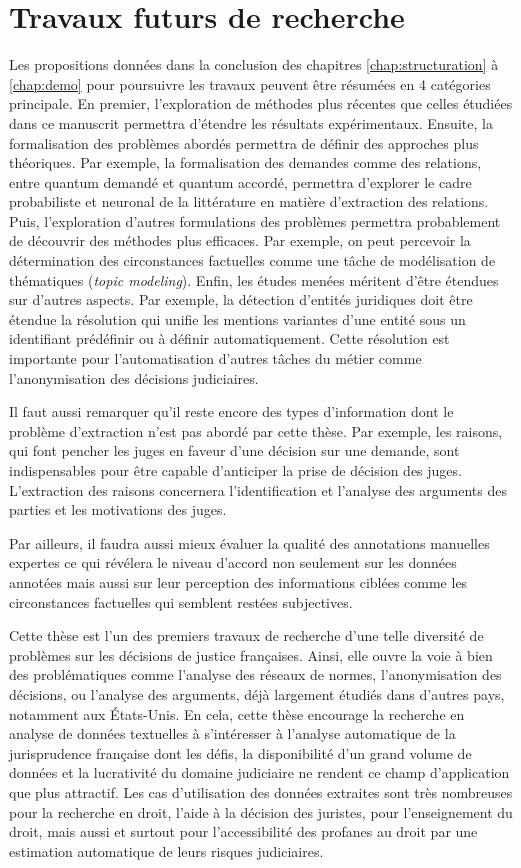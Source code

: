 \section{Travaux futurs de recherche}
\label{sec:conclusion:extensions}
Les propositions données dans la conclusion des chapitres \ref{chap:structuration} à \ref{chap:demo} pour poursuivre les travaux peuvent être résumées en 4 catégories principale. En premier, l'exploration de méthodes plus récentes que celles étudiées dans ce manuscrit permettra d'étendre les résultats expérimentaux. Ensuite, la formalisation des problèmes abordés permettra de définir des approches plus théoriques. Par exemple, la formalisation des demandes comme des relations, entre quantum demandé et quantum accordé, permettra d'explorer le cadre probabiliste et neuronal de la littérature en matière d'extraction des relations. Puis, l'exploration d'autres formulations des problèmes permettra probablement de découvrir des méthodes plus efficaces. Par exemple, on peut percevoir la détermination des circonstances factuelles comme une tâche de modélisation de thématiques (\textit{topic modeling}). Enfin, les études menées méritent d'être étendues sur d'autres aspects. Par exemple, la détection d'entités juridiques doit être étendue la résolution qui unifie les mentions variantes d'une entité sous un identifiant prédéfinir ou à définir automatiquement. Cette résolution est importante pour l'automatisation d'autres tâches du métier comme l'anonymisation des décisions judiciaires.

Il faut aussi remarquer qu'il reste encore des types d'information dont le problème d'extraction n'est pas abordé par cette thèse. Par exemple, les raisons, qui  font pencher les juges en faveur d'une décision sur une demande, sont indispensables pour être capable d'anticiper la prise de décision des juges. L'extraction des raisons concernera l'identification et l'analyse des arguments des parties et les motivations des juges.

 Par ailleurs, il faudra aussi mieux évaluer la qualité des annotations manuelles expertes ce qui révélera le niveau d'accord non seulement sur les données annotées mais aussi sur leur perception des informations ciblées comme les circonstances factuelles qui semblent restées subjectives. 

Cette thèse est l'un des premiers travaux de recherche d'une telle diversité de problèmes sur les décisions de justice françaises. Ainsi, elle ouvre la voie à bien des problématiques comme l'analyse des réseaux de normes, l'anonymisation des décisions, ou l'analyse des arguments, déjà largement étudiés dans d'autres pays, notamment aux États-Unis. En cela, cette thèse encourage la recherche en analyse de données textuelles à s'intéresser à l'analyse automatique de la jurisprudence française dont les défis, la disponibilité d'un grand volume de données et la lucrativité du domaine judiciaire ne rendent ce champ d'application que plus attractif. Les cas d'utilisation des données extraites sont très nombreuses pour la recherche en droit, l'aide à la décision des juristes, pour l'enseignement du droit, mais aussi et surtout pour l'accessibilité des profanes au droit par une estimation automatique de leurs risques judiciaires.
